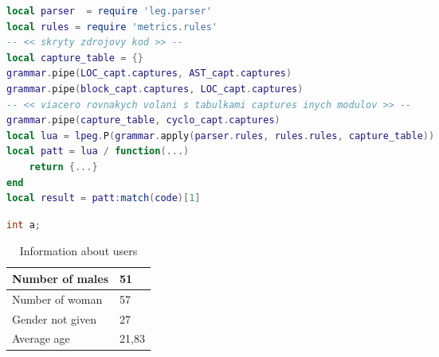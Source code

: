 \begin{lstlisting}[language=lua, caption={Názov}, label=metrics.pipe]
local parser  = require 'leg.parser'
local rules = require 'metrics.rules'
-- << skryty zdrojovy kod >> --
local capture_table = {}
grammar.pipe(LOC_capt.captures, AST_capt.captures)
grammar.pipe(block_capt.captures, LOC_capt.captures)
-- << viacero rovnakych volani s tabulkami captures inych modulov >> --
grammar.pipe(capture_table, cyclo_capt.captures)
local lua = lpeg.P(grammar.apply(parser.rules, rules.rules, capture_table))
local patt = lua / function(...) 
	return {...} 
end
local result = patt:match(code)[1]
\end{lstlisting}

\begin{lstlisting}[language=C++, tabsize=2, caption={Manager}]
int a;
\end{lstlisting}



\begin{table}[ht]
    \centering
    \begin{tabular}{ | l | l | }
    \hline
    Number of males & 51 \\ \hline
    Number of woman & 57 \\ \hline
    Gender not given & 27 \\ \hline
    Average age & 21,83 \\ \hline
    \end{tabular}
    \caption{Information about users}
    \label{tab:table1}
\end{table}
